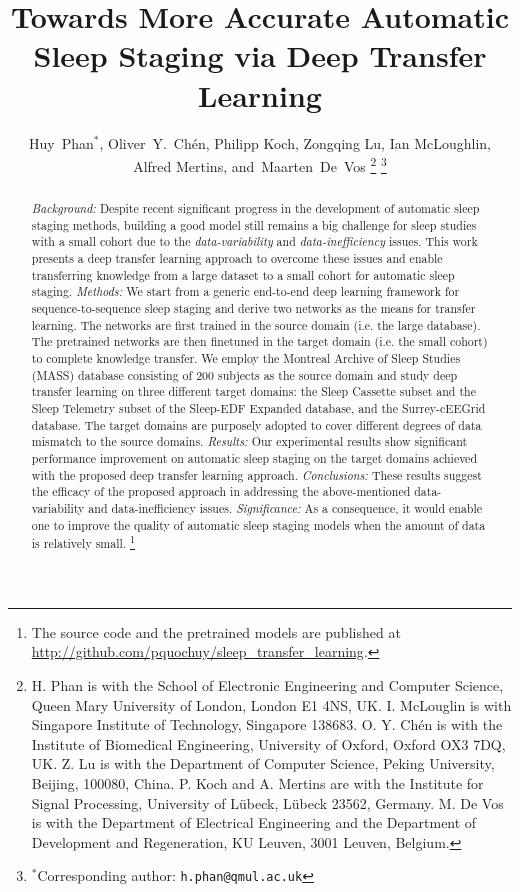 \documentclass[journal,twoside,web]{ieeecolor}
\begin{document}
\title{Towards More Accurate Automatic Sleep Staging via Deep Transfer Learning}
\author{{Huy~Phan$^{*}$, Oliver~Y.~Ch\'{e}n, Philipp Koch, Zongqing Lu, Ian McLoughlin, Alfred Mertins, and~Maarten~De~Vos
\thanks{H. Phan is with the School of Electronic Engineering and Computer Science, Queen Mary University of London, London E1 4NS, UK. I. McLouglin is with Singapore Institute of Technology, Singapore 138683. O. Y. Ch\'{e}n is with the Institute of Biomedical Engineering, University of Oxford, Oxford OX3 7DQ, UK. Z. Lu is with the Department of Computer Science, Peking University, Beijing, 100080, China. P. Koch and A. Mertins are with the Institute for Signal Processing, University of L\"ubeck, L\"ubeck 23562, Germany. M. De Vos is with the Department of Electrical Engineering and the Department of Development and Regeneration, KU Leuven, 3001 Leuven, Belgium.}
\thanks{$^*$Corresponding author: {\tt\footnotesize h.phan@qmul.ac.uk}}
}}

\maketitle

\begin{abstract}
\emph{Background:} Despite recent significant progress in the development of automatic sleep staging methods, building a good model still remains a big challenge for sleep studies with a small cohort due to the \emph{data-variability} and \emph{data-inefficiency} issues. This work presents a deep transfer learning approach to overcome these issues and enable transferring knowledge from a large dataset to a small cohort for automatic sleep staging. \emph{Methods:} We start from a generic end-to-end deep learning framework for sequence-to-sequence sleep staging and derive two networks as the means for transfer learning. The networks are first trained in the source domain (i.e. the large database). The pretrained networks are then finetuned in the target domain (i.e. the small cohort) to complete knowledge transfer. We employ the Montreal Archive of Sleep Studies (MASS) database consisting of 200 subjects as the source domain and study deep transfer learning on three different target domains: the Sleep Cassette subset and the Sleep Telemetry subset of the Sleep-EDF Expanded database, and the Surrey-cEEGrid database. The target domains are purposely adopted to cover different degrees of data mismatch to the source domains. \emph{Results:} Our experimental results show significant performance improvement on automatic sleep staging on the target domains achieved with the proposed deep transfer learning approach. \emph{Conclusions:} These results suggest the efficacy of the proposed approach in addressing the above-mentioned data-variability and data-inefficiency issues. \emph{Significance:} As a consequence, it would enable one to improve the quality of automatic sleep staging models when the amount of data is relatively small.
\footnote{\footnotesize The source code and the pretrained models are published at \url{http://github.com/pquochuy/sleep_transfer_learning}.}
\end{abstract}
\end{document}
